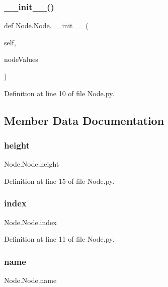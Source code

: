 \subsubsection{\texorpdfstring{\+\_\+\+\_\+init\+\_\+\+\_\+()}{\_\_init\_\_()}}
{\footnotesize\ttfamily def Node.\+Node.\+\_\+\+\_\+init\+\_\+\+\_\+ (\begin{DoxyParamCaption}\item[{}]{self,  }\item[{}]{node\+Values }\end{DoxyParamCaption})}



Definition at line 10 of file Node.\+py.



\subsection{Member Data Documentation}
\mbox{\label{class_node_1_1_node_aca249f2f0b0bcb239c4e201048412b72}} 
\subsubsection{\texorpdfstring{height}{height}}
{\footnotesize\ttfamily Node.\+Node.\+height}



Definition at line 15 of file Node.\+py.

\mbox{\label{class_node_1_1_node_aef9465565b12f9f28b6aefe822948af5}} 
\subsubsection{\texorpdfstring{index}{index}}
{\footnotesize\ttfamily Node.\+Node.\+index}



Definition at line 11 of file Node.\+py.

\mbox{\label{class_node_1_1_node_a66728b66d1a530a57277759e3993550c}} 
\subsubsection{\texorpdfstring{name}{name}}
{\footnotesize\ttfamily Node.\+Node.\+name}



